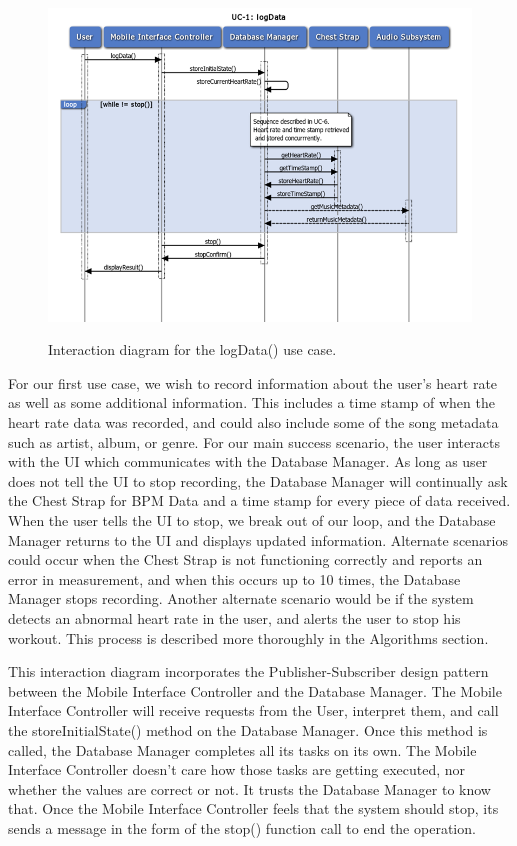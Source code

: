 \documentclass[letterpaper,english, 12pt]{scrreprt}
\begin{document}
\begin{figure}[H]
	\centering
	\includegraphics[scale=.78]{img/Interaction_Diagrams/UC1_logData.png}\\
	\caption {Interaction diagram for the logData() use case.} 
\end{figure}

For our first use case, we wish to record information about the user's heart rate as well as some additional information. This includes a time stamp of when the heart rate data was recorded, and could also include some of the song metadata such as artist, album, or genre. For our main success scenario, the user interacts with the UI which communicates with the Database Manager. As long as user does not tell the UI to stop recording, the Database Manager will continually ask the Chest Strap for BPM Data and a time stamp for every piece of data received. When the user tells the UI to stop, we break out of our loop, and the Database Manager returns to the UI and displays updated information. Alternate scenarios could occur when the Chest Strap is not functioning correctly and reports an error in measurement, and when this occurs up to 10 times, the Database Manager stops recording. Another alternate scenario would be if the system detects an abnormal heart rate in the user, and alerts the user to stop his workout. This process is described more thoroughly in the Algorithms section.

This interaction diagram incorporates the Publisher-Subscriber design pattern between the Mobile Interface Controller and the Database Manager. The Mobile Interface Controller will receive requests from the User, interpret them, and call the storeInitialState() method on the Database Manager. Once this method is called, the Database Manager completes all its tasks on its own. The Mobile Interface Controller doesn't care how those tasks are getting executed, nor whether the values are correct or not. It trusts the Database Manager to know that. Once the Mobile Interface Controller feels that the system should stop, its sends a message in the form of the stop() function call to end the operation.
\end{document}
